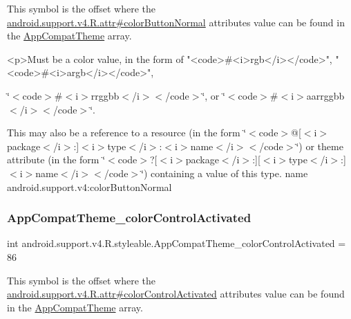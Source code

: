 This symbol is the offset where the \hyperlink{classandroid_1_1support_1_1v4_1_1R_1_1attr_a6d8ed605776f3064c9eccb0a7be8f328}{android.\+support.\+v4.\+R.\+attr\#color\+Button\+Normal} attribute\textquotesingle{}s value can be found in the \hyperlink{classandroid_1_1support_1_1v4_1_1R_1_1styleable_ac07ebbe62ed977f6dcaadc6397840ace}{App\+Compat\+Theme} array.

\begin{DoxyVerb}      <p>Must be a color value, in the form of "<code>#<i>rgb</i></code>", "<code>#<i>argb</i></code>",
\end{DoxyVerb}
 \char`\"{}$<$code$>$\#$<$i$>$rrggbb$<$/i$>$$<$/code$>$\char`\"{}, or \char`\"{}$<$code$>$\#$<$i$>$aarrggbb$<$/i$>$$<$/code$>$\char`\"{}. 

This may also be a reference to a resource (in the form \char`\"{}$<$code$>$@\mbox{[}$<$i$>$package$<$/i$>$\+:\mbox{]}$<$i$>$type$<$/i$>$\+:$<$i$>$name$<$/i$>$$<$/code$>$\char`\"{}) or theme attribute (in the form \char`\"{}$<$code$>$?\mbox{[}$<$i$>$package$<$/i$>$\+:\mbox{]}\mbox{[}$<$i$>$type$<$/i$>$\+:\mbox{]}$<$i$>$name$<$/i$>$$<$/code$>$\char`\"{}) containing a value of this type.  name android.\+support.\+v4\+:color\+Button\+Normal \mbox{\label{classandroid_1_1support_1_1v4_1_1R_1_1styleable_a0b39cc5b040b1cd3704ee635afa68425}} 
\subsubsection{\texorpdfstring{App\+Compat\+Theme\+\_\+color\+Control\+Activated}{AppCompatTheme\_colorControlActivated}}
{\footnotesize\ttfamily int android.\+support.\+v4.\+R.\+styleable.\+App\+Compat\+Theme\+\_\+color\+Control\+Activated = 86\hspace{0.3cm}{\ttfamily [static]}}

This symbol is the offset where the \hyperlink{classandroid_1_1support_1_1v4_1_1R_1_1attr_a6189299faafd419a42d52ab33d2fbe35}{android.\+support.\+v4.\+R.\+attr\#color\+Control\+Activated} attribute\textquotesingle{}s value can be found in the \hyperlink{classandroid_1_1support_1_1v4_1_1R_1_1styleable_ac07ebbe62ed977f6dcaadc6397840ace}{App\+Compat\+Theme} array.

